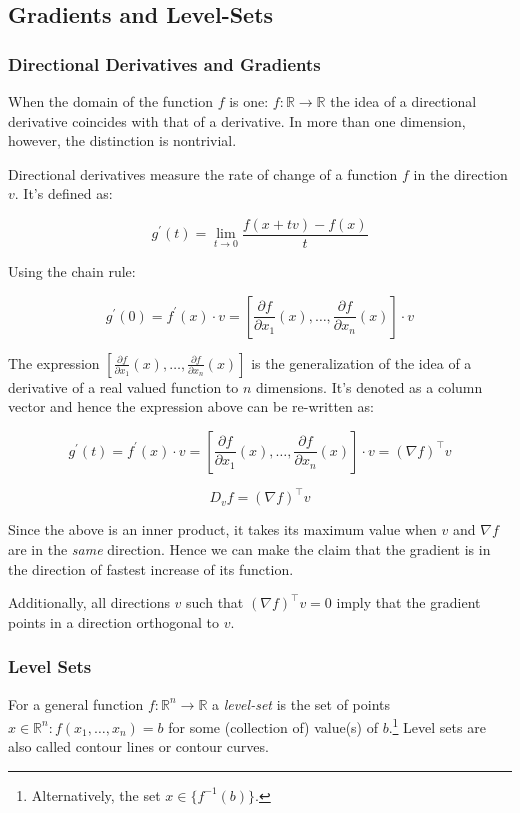 \documentclass[11pt,]{article}
\let\rmarkdownfootnote\footnote%
\def\footnote{\protect\rmarkdownfootnote}
\begin{document}
\subsection{Gradients and Level-Sets}\label{gradients-and-level-sets}

\subsubsection{Directional Derivatives and
Gradients}\label{directional-derivatives-and-gradients}

When the domain of the function \(f\) is one:
\(f:\mathbb{R}\to \mathbb{R}\) the idea of a directional derivative
coincides with that of a derivative. In more than one dimension,
however, the distinction is nontrivial.

Directional derivatives measure the rate of change of a function \(f\)
in the direction \(v\). It's defined as:

\[g^{\prime}(t) = \lim\limits_{t\to 0} \frac{f(x + tv)-f(x)}{t}\]

Using the chain rule:

\[g^{\prime}(0) = f^{\prime}(x)\cdot v=[\frac{\partial f}{\partial x_1}(x),\hdots,\frac{\partial f}{\partial x_n}(x)]\cdot v\]

The expression
\([\frac{\partial f}{\partial x_1}(x),\hdots,\frac{\partial f}{\partial x_n}(x)]\)
is the generalization of the idea of a derivative of a real valued
function to \(n\) dimensions. It's denoted as a column vector and hence
the expression above can be re-written as:

\[g^{\prime}(t) = f^{\prime}(x)\cdot v=[\frac{\partial f}{\partial x_1}(x),\hdots,\frac{\partial f}{\partial x_n}(x)]\cdot v=(\nabla f)^{\top}v\]

\[D_vf=(\nabla f)^{\top}v\]

Since the above is an inner product, it takes its maximum value when
\(v\) and \(\nabla f\) are in the \emph{same} direction. Hence we can
make the claim that the gradient is in the direction of fastest increase
of its function.

Additionally, all directions \(v\) such that \((\nabla f)^{\top}v=0\)
imply that the gradient points in a direction orthogonal to \(v\).

\subsubsection{Level Sets}\label{level-sets}

For a general function \(f:\mathbb{R}^n\to \mathbb{R}\) a
\emph{level-set} is the set of points
\(x\in \mathbb{R}^n: f(x_1,\hdots,x_n)=b\) for some (collection of)
value(s) of \(b\).\footnote{Alternatively, the set
  \(x \in \{f^{-1}(b)\}\).} Level sets are also called contour lines or
contour curves.
\end{document}
